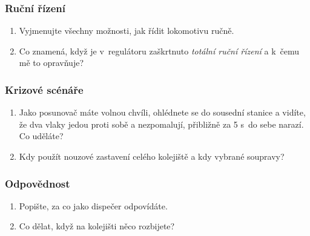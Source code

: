 \documentclass[12pt,a4paper]{article}
\begin{document}
\subsubsection*{Ruční řízení}
\begin{enumerate}[leftmargin=*]
\item Vyjmenujte všechny možnosti, jak řídit lokomotivu ručně.

\item Co znamená, když je v~regulátoru zaškrtnuto \textit{totální ruční řízení}
a k~čemu mě to opravňuje?

\end{enumerate}

\subsubsection*{Krizové scénáře}
\begin{enumerate}[leftmargin=*]
\item Jako posunovač máte volnou chvíli, ohlédnete se do sousední stanice a
vidíte, že dva vlaky jedou proti sobě a nezpomalují, přibližně za 5 s~do sebe
narazí. Co uděláte?

\item Kdy použít nouzové zastavení celého kolejiště a kdy vybrané soupravy?

\end{enumerate}

\subsubsection*{Odpovědnost}
\begin{enumerate}[leftmargin=*]
\item Popište, za co jako dispečer odpovídáte.

\item Co dělat, když na kolejišti něco rozbijete?

\end{enumerate}
\end{document}
